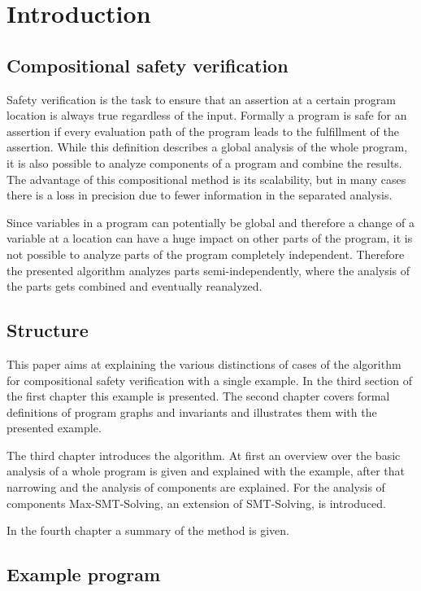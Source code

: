 \section{Introduction}
\label{sec:introduction}

\subsection{Compositional safety verification}

Safety verification is the task to ensure that an assertion at a certain program location is always true regardless of the input.
Formally a program is safe for an assertion if every evaluation path of the program leads to the fulfillment of the assertion.
While this definition describes a global analysis of the whole program, it is also possible to analyze components of a program and combine the results.
The advantage of this compositional method is its scalability, but in many cases there is a loss in precision due to fewer information in the separated analysis.

Since variables in a program can potentially be global and therefore a change of a variable at a location can have a huge impact on other parts of the program, it is not possible to analyze parts of the program completely independent.
Therefore the presented algorithm analyzes parts semi-independently, where the analysis of the parts gets combined and eventually reanalyzed.

\subsection{Structure}

This paper aims at explaining the various distinctions of cases of the algorithm for compositional safety verification with a single example.
In the third section of the first chapter this example is presented.
The second chapter covers formal definitions of program graphs and invariants and illustrates them with the presented example.

The third chapter introduces the algorithm. 
At first an overview over the basic analysis of a whole program is given and explained with the example, after that narrowing and the analysis of components are explained.
For the analysis of components Max-SMT-Solving, an extension of SMT-Solving, is introduced.

In the fourth chapter a summary of the method is given.

\subsection{Example program}

